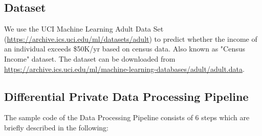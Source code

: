 \documentclass{article}
\begin{document}
\subsection{Dataset}
We use the UCI Machine Learning Adult Data Set (\url{https://archive.ics.uci.edu/ml/datasets/adult}) to predict whether the income of an individual exceeds \$50K/yr based on census data. Also known as "Census Income" dataset. The dataset can be downloaded from \url{https://archive.ics.uci.edu/ml/machine-learning-databases/adult/adult.data}.

\subsection{Differential Private Data Processing Pipeline}
The sample code of the Data Processing Pipeline consists of 6 steps which are briefly described in the following:
\end{document}
